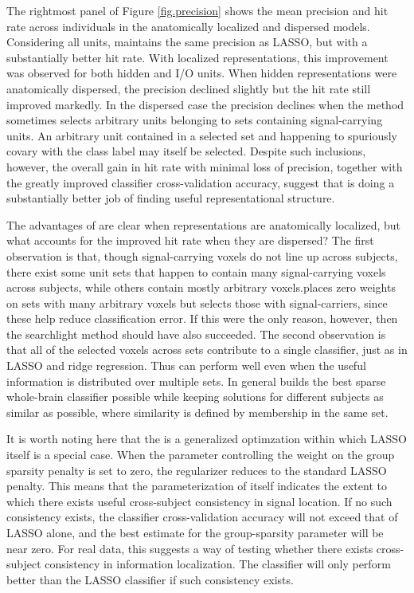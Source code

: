The rightmost panel of Figure \ref{fig.precision} shows the mean precision and hit rate across individuals in the anatomically localized and dispersed models. Considering all units, \soslasso maintains the same precision as LASSO, but with a substantially better hit rate. With localized representations, this improvement was observed for both hidden and I/O units. When hidden representations were anatomically dispersed, the precision declined slightly but the hit rate still improved markedly. In the dispersed case the precision declines when the method sometimes selects arbitrary units belonging to sets containing signal-carrying units. An arbitrary unit contained in a selected set and happening to spuriously covary with the class label may itself be selected. Despite such inclusions, however, the overall gain in hit rate with minimal loss of precision, together with the greatly improved classifier cross-validation accuracy, suggest that \soslasso is doing a substantially better job of finding useful representational structure.

The advantages of \soslasso are clear when representations are anatomically localized, but what accounts for the improved hit rate when they are dispersed? The first observation is that, though signal-carrying voxels do not line up across subjects, there exist some unit sets that happen to contain many signal-carrying voxels across subjects, while others contain mostly arbitrary voxels.\soslasso places zero weights on sets with many arbitrary voxels but selects those with signal-carriers, since these help reduce classification error. If this were the only reason, however, then the searchlight method should have also succeeded. The second observation is that all of the selected voxels across sets contribute to a single classifier, just as in LASSO and ridge regression. Thus \soslasso can perform well even when the useful information is distributed over multiple sets. In general \soslasso builds the best sparse whole-brain classifier possible while keeping solutions for different subjects as similar as possible, where similarity is defined by membership in the same set.

It is worth noting here that the \soslasso is a generalized optimzation within which LASSO itself is a special case. When the parameter controlling the weight on the group sparsity penalty is set to zero, the regularizer reduces to the standard LASSO penalty. This means that the parameterization of \soslasso itself indicates the extent to which there exists useful cross-subject consistency in signal location. If no such consistency exists, the classifier cross-validation accuracy will not exceed that of LASSO alone, and the best estimate for the group-sparsity parameter will be near zero. For real data, this suggests a way of testing whether there exists cross-subject consistency in information localization. The \soslasso classifier will only perform better than the LASSO classifier if such consistency exists.

